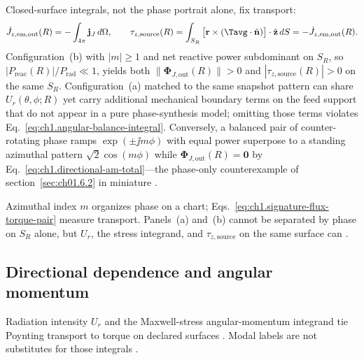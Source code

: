 Closed-surface integrals, not the phase portrait alone, fix transport:
\begin{equation}
\label{eq:ch1.signature-flux-torque-pair}
\dot J_{z,\mathrm{em,out}}(R)=-\int_{4\pi}\mathbf{j}_J\,d\Omega,
\qquad
\tau_{z,\mathrm{source}}(R)=\int_{S_R}\big[\mathbf{r}\times(\Tavg\cdot\hat{\mathbf{n}})\big]\cdot\hat{\mathbf{z}}\,dS
=-\dot J_{z,\mathrm{em,out}}(R).
\end{equation}
Configuration~(b) with \(|m|\ge 1\) and net reactive power subdominant on \(S_R\), so \(|P_{\mathrm{reac}}(R)|/P_{\mathrm{rad}}\ll 1\),
yields both \(\|\boldsymbol{\Phi}_{J,\mathrm{out}}(R)\|>0\) and
\(|\tau_{z,\mathrm{source}}(R)|>0\) on the same \(S_R\).
Configuration~(a) matched to the same snapshot pattern can share \(U_r(\theta,\phi;R)\)
yet carry additional mechanical boundary terms on the feed support that do not appear
in a pure phase-synthesis model; omitting those terms violates
Eq.~\eqref{eq:ch1.angular-balance-integral}. Conversely, a balanced pair of
counter-rotating phase ramps \(\exp(\pm\jj m\phi)\) with equal power superpose to a standing azimuthal pattern \(\sqrt{2}\cos(m\phi)\) while \(\boldsymbol{\Phi}_{J,\mathrm{out}}(R)=\mathbf{0}\) by
Eq.~\eqref{eq:ch1.directional-am-total}---the phase-only counterexample of
section~\ref{sec:ch01.6.2} in miniature \cite{allen1992}.

Azimuthal index $m$ organizes phase on a chart; Eqs.~\eqref{eq:ch1.signature-flux-torque-pair} measure transport. Panels~(a) and~(b) cannot be separated by phase on $S_R$ alone, but $U_r$, the stress integrand, and $\tau_{z,\mathrm{source}}$ on the same surface can \cite{stratton1941,beth1936}.
\subsection{Directional dependence and angular momentum}
\label{sec:ch01.2.1}


Radiation intensity $U_r$ and the Maxwell-stress angular-momentum integrand tie Poynting transport to torque on declared surfaces \cite{poynting1884,belinfante1940,beth1936}. Modal labels are not substitutes for those integrals \cite{stratton1941}.

